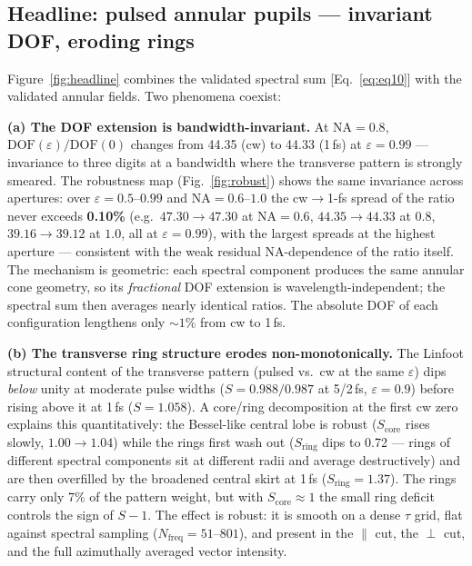 \documentclass[11pt]{article}
\begin{document}
\subsection{Headline: pulsed annular pupils --- invariant DOF, eroding
rings}\label{sec:headline}
Figure~\ref{fig:headline} combines the validated spectral sum
[Eq.~\eqref{eq:eq10}] with the validated annular fields. Two phenomena
coexist:

\textbf{(a) The DOF extension is bandwidth-invariant.} At $\mathrm{NA}=0.8$,
$\mathrm{DOF}(\varepsilon)/\mathrm{DOF}(0)$ changes from 44.35 (cw) to 44.33
(1\,fs) at $\varepsilon=0.99$ --- invariance to three digits at a bandwidth
where the transverse pattern is strongly smeared. The robustness map
(Fig.~\ref{fig:robust}) shows the same invariance across apertures: over
$\varepsilon=0.5$--$0.99$ and $\mathrm{NA}=0.6$--$1.0$ the cw$\to$1-fs spread
of the ratio never exceeds \textbf{0.10\%} (e.g.\ $47.30\!\to\!47.30$ at
$\mathrm{NA}{=}0.6$, $44.35\!\to\!44.33$ at $0.8$, $39.16\!\to\!39.12$ at
$1.0$, all at $\varepsilon=0.99$), with the largest spreads at the highest
aperture --- consistent with the weak residual NA-dependence of the ratio
itself.
The mechanism is geometric: each spectral component produces the same annular
cone geometry, so its \emph{fractional} DOF extension is
wavelength-independent; the spectral sum then averages nearly identical
ratios. The absolute DOF of each configuration lengthens only ${\sim}1\%$ from
cw to 1\,fs.

\textbf{(b) The transverse ring structure erodes non-monotonically.} The
Linfoot structural content of the transverse pattern (pulsed vs.\ cw at the
same $\varepsilon$) dips \emph{below} unity at moderate pulse widths
($S=0.988/0.987$ at 5/2\,fs, $\varepsilon=0.9$) before rising above it at
1\,fs ($S=1.058$). A core/ring decomposition at the first cw zero explains
this quantitatively: the Bessel-like central lobe is robust
($S_{\mathrm{core}}$ rises slowly, $1.00\!\to\!1.04$) while the rings first
wash out ($S_{\mathrm{ring}}$ dips to 0.72 --- rings of different spectral
components sit at different radii and average destructively) and are then
overfilled by the broadened central skirt at 1\,fs
($S_{\mathrm{ring}}=1.37$). The rings carry only 7\% of the pattern weight,
but with $S_{\mathrm{core}}\approx1$ the small ring deficit controls the sign
of $S-1$. The effect is robust: it is smooth on a dense $\tau$ grid, flat
against spectral sampling ($N_{\mathrm{freq}}=51$--$801$), and present in the
$\parallel$ cut, the $\perp$ cut, and the full azimuthally averaged vector
intensity.
\end{document}
